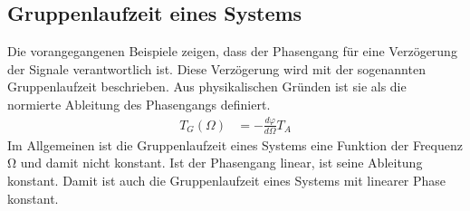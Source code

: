 \subsection{Gruppenlaufzeit eines Systems}\label{sec:8.4.4}

Die vorangegangenen Beispiele zeigen, dass der Phasengang für eine Verzögerung der Signale verantwortlich ist. Diese Verzögerung wird mit der sogenannten Gruppenlaufzeit beschrieben. Aus physikalischen Gründen ist sie als die normierte Ableitung des Phasengangs definiert.
\begin{align}
T_{G}(\Omega) &= - \frac{d\varphi}{d\Omega}  T_{A} \label{eq:8.77}
\end{align}
Im Allgemeinen ist die Gruppenlaufzeit eines Systems eine Funktion der Frequenz Ω und damit nicht konstant. Ist der Phasengang linear, ist seine Ableitung konstant. Damit ist auch die Gruppenlaufzeit eines Systems mit linearer Phase konstant.

